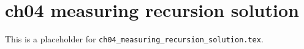\chapter{ch04 measuring recursion solution}
\label{ch04_measuring_recursion_solution}

This is a placeholder for \texttt{ch04_measuring_recursion_solution.tex}.


